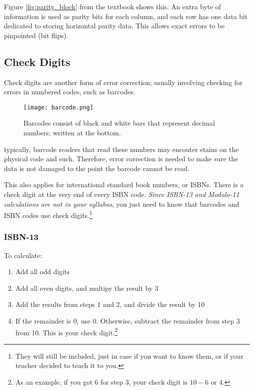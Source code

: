 \documentclass[../main.tex]{subfiles}
\begin{document}
Figure \ref{fig:parity_block} from the textbook shows this. An extra byte of information is used as parity bits for each column, and each row has one data bit dedicated to storing horizontal parity data. This allows exact errors to be pinpointed (bit flips).

\subsection{Check Digits}

Check digits are another form of error correction; usually involving checking for errors in numbered codes, such as barcodes.

\begin{figure}[h]
    \centering
    \texttt{[image: barcode.png]}
    \caption{Barcodes consist of black and white bars that represent decimal numbers; written at the bottom.}
    \label{fig:barcode}
\end{figure}

typically, barcode readers that read these numbers may encouter stains on the physical code and such. Therefore, error correction is needed to make sure the data is not damaged to the point the barcode cannot be read.

This also applies for international standard book numbers, or ISBNs. There is a check digit at the very end of every ISBN code. \emph{Since ISBN-13 and Modulo-11 calculations are not in your syllabus}, you just need to know that barcodes and ISBN codes use check digits.\footnote{They will still be included, just in case if you want to know them, or if your teacher decided to teach it to you.}

\subsubsection{ISBN-13}

To calculate:

\begin{enumerate}
    \item Add all odd digits
    \item Add all even digits, and multipy the result by 3
    \item Add the results from steps 1 and 2, and divide the result by 10
    \item If the remainder is 0, use 0. Otherwise, subtract the remainder from step 3 from 10. This is your check digit.\footnote{As an example, if you got 6 for step 3, your check digit is $10-6$ or 4.}
\end{enumerate}
\end{document}
